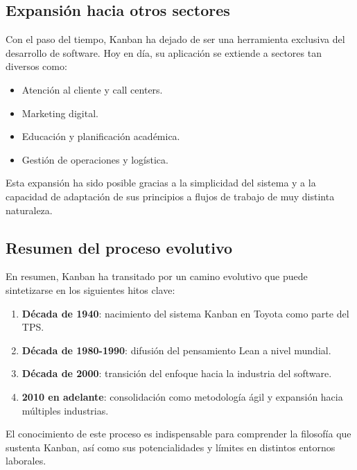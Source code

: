 \subsection{Expansión hacia otros sectores}

Con el paso del tiempo, Kanban ha dejado de ser una herramienta exclusiva del desarrollo de software. Hoy en día, su aplicación se extiende a sectores tan diversos como:
\begin{itemize}
    \item Atención al cliente y call centers.
    \item Marketing digital.
    \item Educación y planificación académica.
    \item Gestión de operaciones y logística.
\end{itemize}

Esta expansión ha sido posible gracias a la simplicidad del sistema y a la capacidad de adaptación de sus principios a flujos de trabajo de muy distinta naturaleza.

\subsection{Resumen del proceso evolutivo}

En resumen, Kanban ha transitado por un camino evolutivo que puede sintetizarse en los siguientes hitos clave:

\begin{enumerate}
    \item \textbf{Década de 1940}: nacimiento del sistema Kanban en Toyota como parte del TPS.
    \item \textbf{Década de 1980-1990}: difusión del pensamiento Lean a nivel mundial.
    \item \textbf{Década de 2000}: transición del enfoque hacia la industria del software.
    \item \textbf{2010 en adelante}: consolidación como metodología ágil y expansión hacia múltiples industrias.
\end{enumerate}

El conocimiento de este proceso es indispensable para comprender la filosofía que sustenta Kanban, así como sus potencialidades y límites en distintos entornos laborales.

